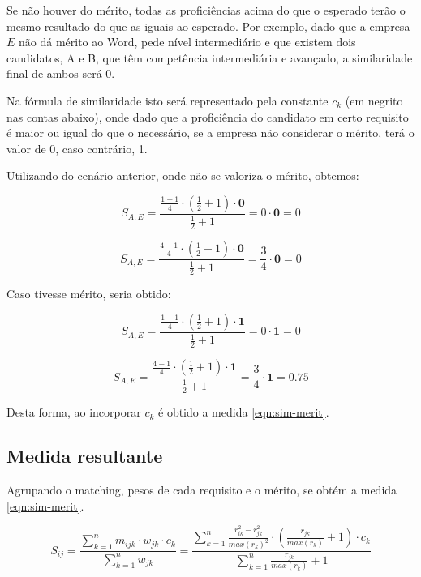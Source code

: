 \documentclass[preprint,12pt]{elsarticle}
\begin{document}
Se não houver do mérito, todas as proficiências acima do que o esperado terão o mesmo resultado do que as iguais ao esperado. Por exemplo, dado que a empresa $E$ não dá mérito ao Word, pede nível intermediário e que existem dois candidatos, A e B, que têm competência intermediária e avançado, a similaridade final de ambos será 0.

Na fórmula de similaridade isto será representado pela constante $c_{k}$ (em negrito nas contas abaixo), onde dado que a proficiência do candidato em certo requisito é maior ou igual do que o necessário, se a empresa não considerar o mérito, terá o valor de 0, caso contrário, 1.

Utilizando do cenário anterior, onde não se valoriza o mérito, obtemos:

$$ S_{A,E} = \frac{\tfrac{1 - 1}{4} \cdot (\tfrac{1}{2} + 1) \cdot \textbf{0}}
                  {\tfrac{1}{2} + 1}
           = 0 \cdot \textbf{0} = 0 $$

$$ S_{A,E} = \frac{\tfrac{4 - 1}{4} \cdot (\tfrac{1}{2} + 1) \cdot \textbf{0}}
                  {\tfrac{1}{2} + 1}
           = \frac{3}{4} \cdot \textbf{0} = 0 $$

Caso tivesse mérito, seria obtido:

$$ S_{A,E} = \frac{\tfrac{1 - 1}{4} \cdot (\tfrac{1}{2} + 1) \cdot \textbf{1}}
                  {\tfrac{1}{2} + 1}
           = 0 \cdot \textbf{1} = 0 $$

$$ S_{A,E} = \frac{\tfrac{4 - 1}{4} \cdot (\tfrac{1}{2} + 1) \cdot \textbf{1}}
                  {\tfrac{1}{2} + 1}
           = \frac{3}{4} \cdot \textbf{1} = 0.75 $$
           
Desta forma, ao incorporar $c_{k}$ é obtido a medida \ref{eqn:sim-merit}.

\subsection{Medida resultante}

Agrupando o matching, pesos de cada requisito e o mérito, se obtém a medida \ref{eqn:sim-merit}.

\begin{equation}
\label{eqn:sim-merit}
S_{ij} =  \frac{\sum_{k=1}^n m_{ijk} \cdot w_{jk} \cdot c_k}
               {\sum_{k=1}^n w_{jk}} =
          \frac{\sum_{k=1}^n \frac{r_{ik}^2 - r_{jk}^2}{max(r_k)^2} \cdot (\frac{r_{jk}}{max(r_k)} + 1) \cdot c_{k}}
               {\sum_{k=1}^n {\frac{r_{jk}}{max(r_k)} + 1}}
\end{equation}
\end{document}
